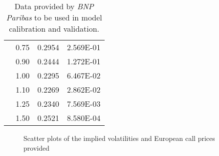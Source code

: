 \begin{table}[!htb]
\begin{adjustwidth}{-0.25cm}{-0.25cm}
\begin{subfigmatrix}{2}
{\begin{tabular}{@{}cccc@{}}
 & 0.75 & 0.2954 & \num{2.569E-01} \\
 & 0.90 & 0.2444 & \num{1.272E-01} \\
 & 1.00 & 0.2295 & \num{6.467E-02} \\
 & 1.10 & 0.2269 & \num{2.862E-02} \\
 & 1.25 & 0.2340 & \num{7.569E-03} \\
 & 1.50 & 0.2521 & \num{8.580E-04} \\ \bottomrule
\end{tabular}
}
  \end{subfigmatrix}
  \caption[Data provided by \emph{BNP Paribas} to be used in model calibration and validation.]{Data provided by \emph{BNP Paribas} to be used in model calibration and validation.}
  \label{tab:mktdata}
  \end{adjustwidth}
\end{table}



\begin{figure}[!htb]
  \begin{subfigmatrix}{2}
  \end{subfigmatrix}
  \caption[Scatter plots of the implied volatilities and European call prices provided]{Scatter plots of the implied volatilities and European call prices provided}
  \label{fig:mktdata}
\end{figure}


